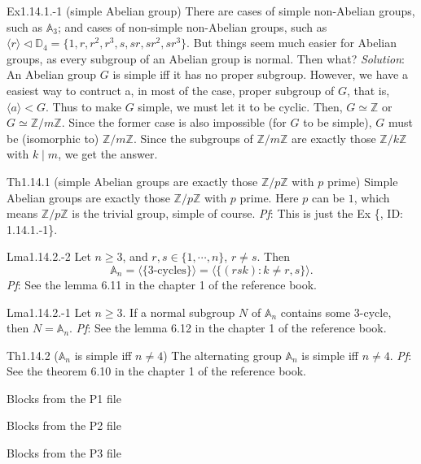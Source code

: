 \documentclass{article}
\newcommand{\nles}{\vartriangleleft}
\begin{document}
\begin{Th}{Ex1.14.1.-1 (simple Abelian group)}
    \textcolor{Th}{There are cases of simple non-Abelian groups, such as $\mathbb{A}_3$; and cases of non-simple non-Abelian groups, such as $\langle r\rangle\nles\mathbb{D}_4 = \{1, r, r^2, r^3, s, sr, sr^2, sr^3\}$.} But things seem much easier for Abelian groups, as every subgroup of an Abelian group is normal. Then what?
    \tcblower
    \textit{Solution}: An Abelian group $G$ is simple iff it has no proper subgroup. However, we have a easiest way to contruct a, in most of the case, proper subgroup of $G$, that is, $\langle a\rangle < G$. Thus to make $G$ simple, we must let it to be cyclic. Then, $G\simeq\mathbb{Z}$ or $G\simeq\mathbb{Z}/m\mathbb{Z}$. Since the former case is also impossible (for $G$ to be simple), $G$ must be (isomorphic to) $\mathbb{Z}/m\mathbb{Z}$. Since the subgroups of $\mathbb{Z}/m\mathbb{Z}$ are exactly those $\mathbb{Z}/k\mathbb{Z}$ with $k\mid m$, we get the answer.
\end{Th}

\begin{Th}{Th1.14.1 (simple Abelian groups are exactly those $\mathbb{Z}/p\mathbb{Z}$ with $p$ prime)}
    Simple Abelian groups are exactly those $\mathbb{Z}/p\mathbb{Z}$ with $p$ prime. Here $p$ can be $1$, which means $\mathbb{Z}/p\mathbb{Z}$ is the trivial group, simple of course.
    \tcblower
    \textit{Pf}: This is just the Ex \{, ID: 1.14.1.-1\}.
\end{Th}

\begin{Th}{Lma1.14.2.-2}
    Let $n\geq 3$, and $r,s\in\{1,\cdots, n\}$, $r\neq s$. Then 
    $$ \mathbb{A}_n = \langle \{\text{3-cycles}\} \rangle = \langle \{(rsk): k\neq r,s\} \rangle. $$
    \tcblower
    \textit{Pf}: See the lemma 6.11 in the chapter 1 of the reference book.
\end{Th}

\begin{Th}{Lma1.14.2.-1}
    Let $n\geq 3$. If a normal subgroup $N$ of $\mathbb{A}_n$ contains some 3-cycle, then $N = \mathbb{A}_n$.
    \tcblower
    \textit{Pf}: See the lemma 6.12 in the chapter 1 of the reference book.
\end{Th}

\begin{Th}{Th1.14.2 ($\mathbb{A}_n$ is simple iff $n\neq 4$)}
    The alternating group $\mathbb{A}_n$ is simple iff $n\neq 4$.
    \tcblower
    \textit{Pf}: See the theorem 6.10 in the chapter 1 of the reference book.
\end{Th}

\begin{Th}{Blocks from the P1 file}
\end{Th}

\begin{Th}{Blocks from the P2 file}
\end{Th}

\begin{Th}{Blocks from the P3 file}
\end{Th}
\end{document}
